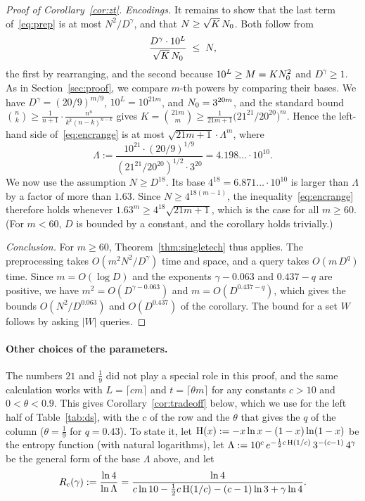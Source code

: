 \begin{proof}[Proof of Corollary~\ref{cor:zt}]
\emph{Encodings.} It remains to show that the last term of~\eqref{eq:prep} is at most $N^2/D^{\gamma}$, and that $N\ge\sqrt K\,N_0$. Both follow from
\begin{equation}\label{eq:encrange}
\frac{D^{\gamma}\cdot10^L}{\sqrt K\,N_0}\;\le\;N ,
\end{equation}
the first by rearranging, and the second because $10^L\ge M=KN_0^2$ and $D^{\gamma}\ge1$. As in Section~\ref{sec:proof}, we compare $m$-th powers by comparing their bases. We have $D^{\gamma}=(20/9)^{m/9}$, $10^L=10^{21m}$, and $N_0=3^{20m}$, and the standard bound $\binom nk\ge\frac1{n+1}\cdot\frac{n^n}{k^k(n-k)^{n-k}}$ gives $K=\binom{21m}m\ge\frac1{21m+1}\big(21^{21}/20^{20}\big)^m$. Hence the left-hand side of~\eqref{eq:encrange} is at most $\sqrt{21m+1}\cdot\Lambda^m$, where
\[
\Lambda:=\frac{10^{21}\cdot(20/9)^{1/9}}{(21^{21}/20^{20})^{1/2}\cdot3^{20}}=4.198\ldots\cdot10^{10} .
\]
We now use the assumption $N\ge D^{18}$. Its base $4^{18}=6.871\ldots\cdot10^{10}$ is larger than $\Lambda$ by a factor of more than $1.63$. Since $N\ge4^{18(m-1)}$, the inequality~\eqref{eq:encrange} therefore holds whenever $1.63^m\ge4^{18}\sqrt{21m+1}$, which is the case for all $m\ge60$. (For $m<60$, $D$ is bounded by a constant, and the corollary holds trivially.)

\emph{Conclusion.} For $m\ge60$, Theorem~\ref{thm:singletech} thus applies. The preprocessing takes $O(m^2N^2/D^{\gamma})$ time and space, and a query takes $O(m\,D^{q})$ time. Since $m=O(\log D)$ and the exponents $\gamma-0.063$ and $0.437-q$ are positive, we have $m^2=O(D^{\gamma-0.063})$ and $m=O(D^{0.437-q})$, which gives the bounds $O(N^2/D^{0.063})$ and $O(D^{0.437})$ of the corollary. The bound for a set $W$ follows by asking $|W|$ queries.
\end{proof}

\paragraph{Other choices of the parameters.}
The numbers $21$ and $\frac19$ did not play a special role in this proof, and the same calculation works with $L=\lceil cm\rceil$ and $t=\lceil\theta m\rceil$ for any constants $c>10$ and $0<\theta<0.9$. This gives Corollary~\ref{cor:tradeoff} below, which we use for the left half of Table~\ref{tab:ds}, with the $c$ of the row and the $\theta$ that gives the $q$ of the column ($\theta=\frac19$ for $q=0.43$). To state it, let $\operatorname{H}(x):=-x\ln x-(1-x)\ln(1-x)$ be the entropy function (with natural logarithms), let $\Lambda:=10^{c}\,e^{-\frac12c\operatorname{H}(1/c)}\,3^{-(c-1)}\,4^{\gamma}$ be the general form of the base $\Lambda$ above, and let
\begin{equation}\label{eq:Rc}
R_c(\gamma):=\frac{\ln4}{\ln\Lambda}=\frac{\ln4}{c\ln10-\tfrac12c\operatorname{H}(1/c)-(c-1)\ln3+\gamma\ln4} .
\end{equation}

